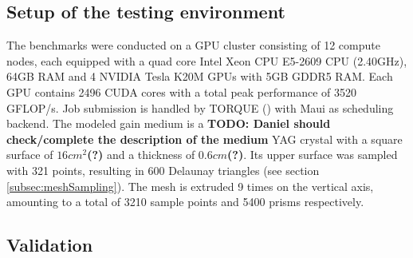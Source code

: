 \subsection{Setup of the testing environment}
\label{subsec:testingEnvironment}


The benchmarks were conducted on a GPU cluster consisting of 12 compute nodes,
each equipped with a quad core Intel Xeon CPU E5-2609 CPU (2.40GHz), 64GB RAM
and 4 NVIDIA Tesla K20M GPUs with 5GB GDDR5 RAM. Each GPU contains 2496 CUDA cores with a total
peak performance of 3520 GFLOP/s. Job submission is handled by TORQUE
(\cite{torque}) with Maui as scheduling backend. The modeled gain medium is a
\textbf{TODO: Daniel should check/complete the description of the medium} YAG
crystal with a square surface of $16cm^2$\textbf{(?)} and a thickness of
$0.6cm$\textbf{(?)}. Its upper surface was sampled with 321 points, resulting in
600 Delaunay triangles (see section \ref{subsec:meshSampling}). The mesh is
extruded 9 times on the vertical axis, amounting to a total of 3210 sample
points and 5400 prisms respectively.

\subsection{Validation}
\label{subsec:validation}

